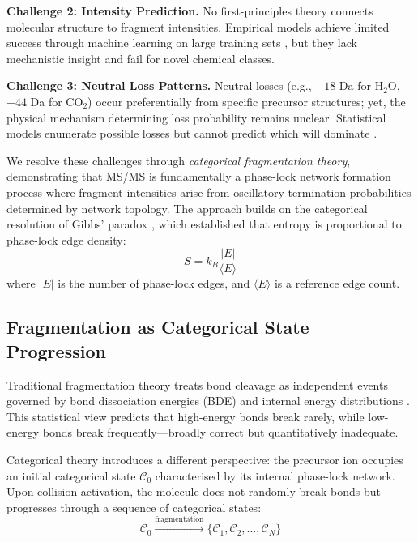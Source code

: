 \documentclass[twocolumn,10pt,a4paper]{article}
\theoremstyle{definition}
\theoremstyle{remark}
\begin{document}
\textbf{Challenge 2: Intensity Prediction.} No first-principles theory connects molecular structure to fragment intensities. Empirical models achieve limited success through machine learning on large training sets \cite{wei2019rapid,duhrkop2019sirius}, but they lack mechanistic insight and fail for novel chemical classes.

\textbf{Challenge 3: Neutral Loss Patterns.} Neutral losses (e.g., $-18$ Da for H$_2$O, $-44$ Da for CO$_2$) occur preferentially from specific precursor structures; yet, the physical mechanism determining loss probability remains unclear. Statistical models enumerate possible losses but cannot predict which will dominate \cite{kind2007fiehnlib}.

We resolve these challenges through \emph{categorical fragmentation theory}, demonstrating that MS/MS is fundamentally a phase-lock network formation process where fragment intensities arise from oscillatory termination probabilities determined by network topology. The approach builds on the categorical resolution of Gibbs' paradox \cite{sachikonye2024gibbs}, which established that entropy is proportional to phase-lock edge density:
\begin{equation}
S = k_B \frac{|E|}{\langle E \rangle}
\label{eq:topological_entropy}
\end{equation}
where $|E|$ is the number of phase-lock edges, and $\langle E \rangle$ is a reference edge count.

\subsection{Fragmentation as Categorical State Progression}

Traditional fragmentation theory treats bond cleavage as independent events governed by bond dissociation energies (BDE) and internal energy distributions \cite{mclafferty1993tandem}. This statistical view predicts that high-energy bonds break rarely, while low-energy bonds break frequently—broadly correct but quantitatively inadequate.

Categorical theory introduces a different perspective: the precursor ion occupies an initial categorical state $\mathcal{C}_0$ characterised by its internal phase-lock network. Upon collision activation, the molecule does not randomly break bonds but progresses through a sequence of categorical states:
\begin{equation}
\mathcal{C}_0 \xrightarrow{\text{fragmentation}} \{\mathcal{C}_1, \mathcal{C}_2, \ldots, \mathcal{C}_N\}
\end{equation}
\end{document}
